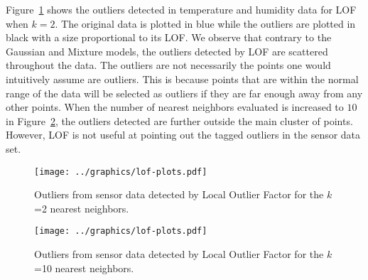 Figure~\ref{fig:lof_2} shows the outliers detected in temperature and humidity data for LOF when $k=2$.
The original data is plotted in blue while the outliers are plotted in black with a size proportional to its LOF.
We observe that contrary to the Gaussian and Mixture models, the outliers detected by LOF are scattered throughout the data.
The outliers are not necessarily the points one would intuitively assume are outliers.
This is because points that are within the normal range of the data will be selected as outliers if they are far enough away from any other points.
When the number of nearest neighbors evaluated is increased to $10$ in Figure~\ref{fig:lof_10}, the outliers detected are further outside the main cluster of points.
However, LOF is not useful at pointing out the tagged outliers in the sensor data set.

\begin{figure}[h]
\centering
\texttt{[image: ../graphics/lof-plots.pdf]}
\caption{Outliers from sensor data detected by Local Outlier Factor for the $k$=2 nearest neighbors.}
\label{fig:lof_2}
\end{figure}
\begin{figure}[h]
\centering
\texttt{[image: ../graphics/lof-plots.pdf]}
\caption{Outliers from sensor data detected by Local Outlier Factor for the $k$=10 nearest neighbors.}
\label{fig:lof_10}
\end{figure}
